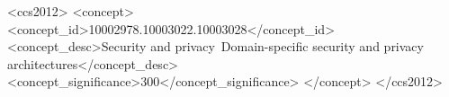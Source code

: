 \begin{CCSXML}
	<ccs2012>
	<concept>
	<concept_id>10002978.10003022.10003028</concept_id>
	<concept_desc>Security and privacy~Domain-specific security and privacy architectures</concept_desc>
	<concept_significance>300</concept_significance>
	</concept>
	</ccs2012>
\end{CCSXML}





\maketitle